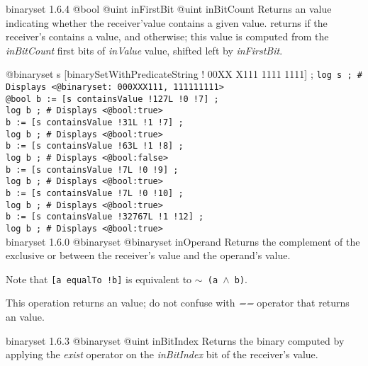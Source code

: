 {binaryset}
{1.6.4}
{@bool}
{@uint inFirstBit}
{@uint inBitCount}
{Returns an  value indicating whether the receiver'value contains a given value.}
{returns  if the receiver's contains a value, and  otherwise; this value is computed from the \emph{inBitCount} first bits of \emph{inValue} value, shifted left by \emph{inFirstBit}.}


\exempleUneLigne
{}
{@binaryset s [binarySetWithPredicateString ! 00XX X111 1111 1111\textquotedbl] ;}
\texttt{log s ; \# Displays <@binaryset:~000XXX111, 111111111>}\\
\texttt{@bool b := [s containsValue !127L !0 !7] ;}\\
\texttt{log b ; \# Displays <@bool:true>}\\
\texttt{b := [s containsValue !31L !1 !7] ;}\\
\texttt{log b ; \# Displays <@bool:true>}\\
\texttt{b := [s containsValue !63L !1 !8] ;}\\
\texttt{log b ; \# Displays <@bool:false>}\\
\texttt{b := [s containsValue !7L !0 !9] ;}\\
\texttt{log b ; \# Displays <@bool:true>}\\
\texttt{b := [s containsValue !7L !0 !10] ;}\\
\texttt{log b ; \# Displays <@bool:true>}\\
\texttt{b := [s containsValue !32767L !1 !12] ;}\\
\texttt{log b ; \# Displays <@bool:true>}\\








{binaryset}
{1.6.0}
{@binaryset}
{@binaryset inOperand}
{Returns the complement of the exclusive or between the receiver's value and the operand's value.}
{}

Note that \texttt{[a equalTo !b]} is equivalent to \texttt{$\sim$ (a $\wedge$ b)}.

This operation returns an  value; do not confuse with \emph{==} operator that returns an  value.







{binaryset}
{1.6.3}
{@binaryset}
{@uint inBitIndex}
{Returns the binary computed by applying the \emph{exist} operator on the \emph{inBitIndex} bit of the receiver's value.}
{}







